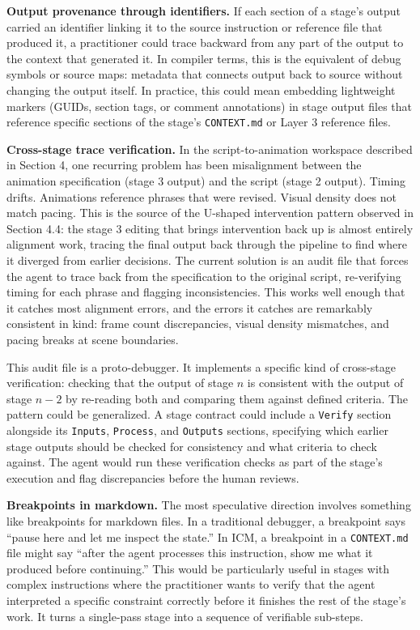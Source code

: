 \documentclass[acmlarge,nonacm,screen]{acmart}
\begin{document}
\textbf{Output provenance through identifiers.} If each section of a stage's output carried an identifier linking it to the source instruction or reference file that produced it, a practitioner could trace backward from any part of the output to the context that generated it. In compiler terms, this is the equivalent of debug symbols or source maps: metadata that connects output back to source without changing the output itself. In practice, this could mean embedding lightweight markers (GUIDs, section tags, or comment annotations) in stage output files that reference specific sections of the stage's \texttt{CONTEXT.md} or Layer 3 reference files.

\textbf{Cross-stage trace verification.} In the script-to-animation workspace described in Section 4, one recurring problem has been misalignment between the animation specification (stage 3 output) and the script (stage 2 output). Timing drifts. Animations reference phrases that were revised. Visual density does not match pacing. This is the source of the U-shaped intervention pattern observed in Section 4.4: the stage 3 editing that brings intervention back up is almost entirely alignment work, tracing the final output back through the pipeline to find where it diverged from earlier decisions. The current solution is an audit file that forces the agent to trace back from the specification to the original script, re-verifying timing for each phrase and flagging inconsistencies. This works well enough that it catches most alignment errors, and the errors it catches are remarkably consistent in kind: frame count discrepancies, visual density mismatches, and pacing breaks at scene boundaries.

This audit file is a proto-debugger. It implements a specific kind of cross-stage verification: checking that the output of stage $n$ is consistent with the output of stage $n-2$ by re-reading both and comparing them against defined criteria. The pattern could be generalized. A stage contract could include a \texttt{Verify} section alongside its \texttt{Inputs}, \texttt{Process}, and \texttt{Outputs} sections, specifying which earlier stage outputs should be checked for consistency and what criteria to check against. The agent would run these verification checks as part of the stage's execution and flag discrepancies before the human reviews.

\textbf{Breakpoints in markdown.} The most speculative direction involves something like breakpoints for markdown files. In a traditional debugger, a breakpoint says ``pause here and let me inspect the state.'' In ICM, a breakpoint in a \texttt{CONTEXT.md} file might say ``after the agent processes this instruction, show me what it produced before continuing.'' This would be particularly useful in stages with complex instructions where the practitioner wants to verify that the agent interpreted a specific constraint correctly before it finishes the rest of the stage's work. It turns a single-pass stage into a sequence of verifiable sub-steps.
\end{document}
